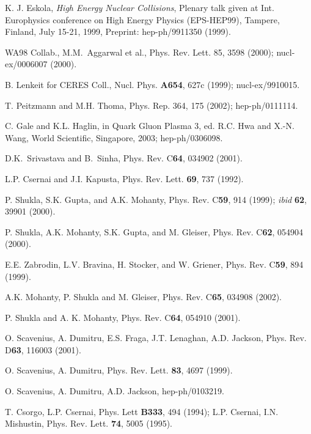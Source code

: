 \begin{thebibliography}{00}

 K. J. Eskola, {\it High Energy Nuclear Collisions}, 
  Plenary talk given at Int. Europhysics conference on High Energy Physics 
  (EPS-HEP99), Tampere, Finland, July 15-21, 1999, 
  Preprint: hep-ph/9911350 (1999).
  
 WA98 Collab., M.M.\ Aggarwal et al., 
            Phys. Rev. Lett. 85, 3598 (2000); nucl-ex/0006007 (2000).

 B. Lenkeit for CERES Coll., 
        Nucl. Phys. {\bf A654}, 627c (1999); nucl-ex/9910015.  
  
 T. Peitzmann and M.H. Thoma, Phys. Rep. 364, 175 (2002);
                    hep-ph/0111114.

 C. Gale and K.L. Haglin, in {Quark Gluon Plasma 3},
    ed. R.C. Hwa and X.-N. Wang, World Scientific, Singapore, 2003;
    hep-ph/0306098. 
          
 D.K.\ Srivastava and B.\ Sinha, 
            Phys. Rev. C{\bf 64}, 034902 (2001). 

 L.P. Csernai and J.I. Kapusta, Phys. Rev. Lett. {\bf 69},
               737 (1992).

 P. Shukla, S.K. Gupta, and A.K. Mohanty,
         Phys. Rev. C{\bf 59}, 914 (1999); {\it ibid} {\bf 62}, 39901 (2000).

 P. Shukla, A.K. Mohanty, S.K. Gupta, and M. Gleiser,
              Phys. Rev. C{\bf 62}, 054904 (2000).

 E.E. Zabrodin, L.V. Bravina, H. Stocker, and W. Griener,
         Phys. Rev. C{\bf 59}, 894 (1999).

 A.K. Mohanty, P. Shukla and M. Gleiser,
              Phys. Rev. C{\bf 65}, 034908 (2002).
              
 P. Shukla and A. K. Mohanty, Phys. Rev. C{\bf 64},
        054910 (2001).              

 O. Scavenius, A. Dumitru, E.S. Fraga, J.T. Lenaghan,
         A.D. Jackson, Phys. Rev. D{\bf 63}, 116003 (2001).

 O. Scavenius, A. Dumitru,
         Phys. Rev. Lett. {\bf 83}, 4697 (1999).
         
 O. Scavenius, A. Dumitru, A.D. Jackson, 
          hep-ph/0103219.
          
 T. Csorgo, L.P. Csernai, Phys. Lett {\bf B333}, 494 (1994);
       L.P. Csernai, I.N. Mishustin, Phys. Rev. Lett. {\bf 74}, 5005 (1995).
       

\end{thebibliography}
